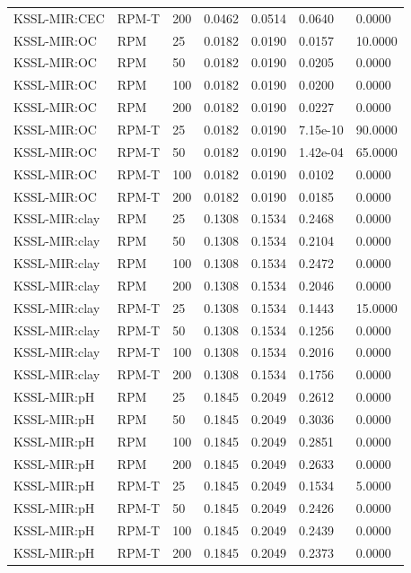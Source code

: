 \begin{tabular}{lllllll}
KSSL-MIR:CEC & RPM-T & 200 & 0.0462 & 0.0514 & 0.0640 & 0.0000 \\
KSSL-MIR:OC & RPM & 25 & 0.0182 & 0.0190 & 0.0157 & 10.0000 \\
KSSL-MIR:OC & RPM & 50 & 0.0182 & 0.0190 & 0.0205 & 0.0000 \\
KSSL-MIR:OC & RPM & 100 & 0.0182 & 0.0190 & 0.0200 & 0.0000 \\
KSSL-MIR:OC & RPM & 200 & 0.0182 & 0.0190 & 0.0227 & 0.0000 \\
KSSL-MIR:OC & RPM-T & 25 & 0.0182 & 0.0190 & 7.15e-10 & 90.0000 \\
KSSL-MIR:OC & RPM-T & 50 & 0.0182 & 0.0190 & 1.42e-04 & 65.0000 \\
KSSL-MIR:OC & RPM-T & 100 & 0.0182 & 0.0190 & 0.0102 & 0.0000 \\
KSSL-MIR:OC & RPM-T & 200 & 0.0182 & 0.0190 & 0.0185 & 0.0000 \\
KSSL-MIR:clay & RPM & 25 & 0.1308 & 0.1534 & 0.2468 & 0.0000 \\
KSSL-MIR:clay & RPM & 50 & 0.1308 & 0.1534 & 0.2104 & 0.0000 \\
KSSL-MIR:clay & RPM & 100 & 0.1308 & 0.1534 & 0.2472 & 0.0000 \\
KSSL-MIR:clay & RPM & 200 & 0.1308 & 0.1534 & 0.2046 & 0.0000 \\
KSSL-MIR:clay & RPM-T & 25 & 0.1308 & 0.1534 & 0.1443 & 15.0000 \\
KSSL-MIR:clay & RPM-T & 50 & 0.1308 & 0.1534 & 0.1256 & 0.0000 \\
KSSL-MIR:clay & RPM-T & 100 & 0.1308 & 0.1534 & 0.2016 & 0.0000 \\
KSSL-MIR:clay & RPM-T & 200 & 0.1308 & 0.1534 & 0.1756 & 0.0000 \\
KSSL-MIR:pH & RPM & 25 & 0.1845 & 0.2049 & 0.2612 & 0.0000 \\
KSSL-MIR:pH & RPM & 50 & 0.1845 & 0.2049 & 0.3036 & 0.0000 \\
KSSL-MIR:pH & RPM & 100 & 0.1845 & 0.2049 & 0.2851 & 0.0000 \\
KSSL-MIR:pH & RPM & 200 & 0.1845 & 0.2049 & 0.2633 & 0.0000 \\
KSSL-MIR:pH & RPM-T & 25 & 0.1845 & 0.2049 & 0.1534 & 5.0000 \\
KSSL-MIR:pH & RPM-T & 50 & 0.1845 & 0.2049 & 0.2426 & 0.0000 \\
KSSL-MIR:pH & RPM-T & 100 & 0.1845 & 0.2049 & 0.2439 & 0.0000 \\
KSSL-MIR:pH & RPM-T & 200 & 0.1845 & 0.2049 & 0.2373 & 0.0000 \\

\end{tabular}
